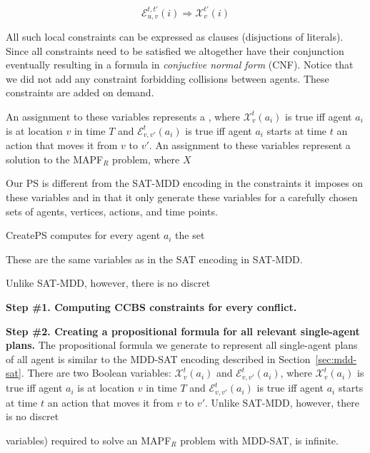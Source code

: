 \documentclass[review]{elsarticle}
\newcommand{\ccbs}{\ac{CCBS}\xspace}
\newcommand{\ps}{\ac{PS}\xspace}
\newcommand{\mapfr}{\ac{MAPF}$_R$\xspace}
\begin{document}
\begin{equation}
{  \mathcal{E}_{u,v}^{t,t'}(i) \Rightarrow \mathcal{X}_v^{t'}(i)
}
\label{eq-3}
\end{equation}

All such local constraints can be expressed as clauses (disjuctions of literals). Since all constraints need to be satisfied we altogether have their conjunction eventually resulting in a formula in {\em conjuctive normal form} (CNF). Notice that we did not add any constraint forbidding collisions between agents. These constraints are added on demand.





An assignment to these variables represents a 
, where $\mathcal{X}_v^t(a_i)$ is true iff agent $a_i$ is at location $v$ in time $T$ and 
$\mathcal{E}_{v,v'}^{t}(a_i)$ is true iff agent $a_i$ starts at time $t$ an action that moves it from $v$ to $v'$. An assignment to these variables represent a solution to the \mapfr problem, 
where $X$

Our \ps is different from the SAT-MDD encoding in the constraints it imposes on these variables and in that it only generate these variables for a carefully chosen sets of agents, vertices, actions, and time points. 




CreatePS computes for every agent $a_i$ the set 

These are the same variables as in the SAT encoding in SAT-MDD. 

Unlike SAT-MDD, however, there is no discret



\noindent \textbf{Step \#1. Computing \ccbs constraints for every conflict.}


\noindent \textbf{Step \#2. Creating a propositional formula for all relevant single-agent plans.} 
The propositional formula we generate to represent all single-agent plans of all agent is similar to the MDD-SAT encoding described in Section~\ref{sec:mdd-sat}. 
There are two Boolean variables: $\mathcal{X}_{v}^{t}(a_i)$ and 
$\mathcal{E}_{v,v'}^{t}(a_i)$, where $\mathcal{X}_v^t(a_i)$ is true iff agent $a_i$ is at location $v$ in time $T$ and 
$\mathcal{E}_{v,v'}^{t}(a_i)$ is true iff agent $a_i$ starts at time $t$ an action that moves it from $v$ to $v'$. Unlike SAT-MDD, however, there is no discret


variables) required to solve an \mapfr problem with MDD-SAT, is infinite. 
\end{document}
